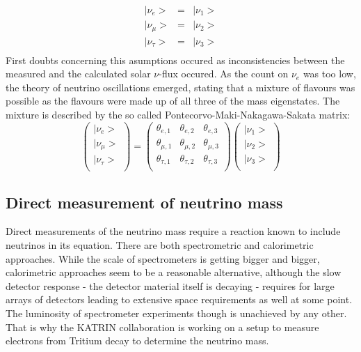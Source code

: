     \begin{equation}
	\begin{array}{ccc}
      	|\nu_e>		& = & |\nu_1>\\
      	|\nu_\mu>	& = & |\nu_2>\\
      	|\nu_\tau>	& = & |\nu_3>\\
    	 \end{array}
    \end{equation}
    First doubts concerning this asumptions occured as inconsistencies between the measured and the calculated solar $\nu$-flux occured. As the count on $\nu_e$ was too low, the theory of neutrino oscillations emerged, stating that a mixture of flavours was possible as the flavours were made up of all three of the mass eigenstates. The mixture is described by the so called Pontecorvo-Maki-Nakagawa-Sakata matrix:
        \begin{equation}
        \left(
        \begin{array}{c}
	  |\nu_e>\\
	  |\nu_\mu>\\
	  |\nu_\tau>\\
        \end{array}
        \right)
	 = \left(
	\begin{array}{ccc}
      	\theta_{e,1} & \theta_{e,2} & \theta_{e,3}\\
      	\theta_{\mu,1} & \theta_{\mu,2} & \theta_{\mu,3}\\
      	\theta_{\tau,1} & \theta_{\tau,2} & \theta_{\tau,3}\\
      	\end{array}
	\right)
	\left(
	\begin{array}{c}
      	|\nu_1>\\
      	|\nu_2>\\
      	|\nu_3>\\
    	 \end{array}
    	 \right)
    \end{equation}
    
    \subsection{Direct measurement of neutrino mass}
    \label{ch:Introduction:sec:Massive neutrino:subsec:direct Neutrino Mass measurement}
    Direct measurements of the neutrino mass require a reaction known to include neutrinos in its equation. There are both spectrometric and calorimetric approaches. While the scale of spectrometers is getting bigger and bigger, calorimetric approaches seem to be a reasonable alternative, although the slow detector response - the detector material itself is decaying - requires for large arrays of detectors leading to extensive space requirements as well at some point. The luminosity of spectrometer experiments though is unachieved by any other. That is why the KATRIN collaboration is working on a setup to measure electrons from Tritium decay to determine the neutrino mass. 
     
